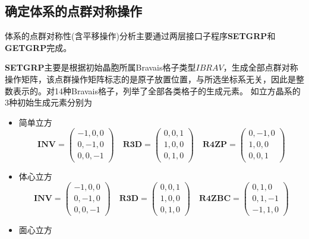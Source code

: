 \documentclass{article}      %
\begin{document}
\subsection{确定体系的点群对称操作}
体系的点群对称性(含平移操作)分析主要通过两层接口子程序\textbf{SETGRP}和\textbf{GETGRP}完成。

\textbf{SETGRP}主要是根据初始晶胞所属\textrm{Bravais}格子类型$\mathit{IBRAV}$，生成全部点群对称操作矩阵，该点群操作矩阵标志的是原子放置位置，与所选坐标系无关，因此是整数表示的。对14种\textrm{Bravais}格子，列举了全部各类格子的生成元素。
如立方晶系的3种初始生成元素分别为
\begin{itemize}
	\item 简单立方
\begin{displaymath}
	\mathbf{INV}=
	\begin{pmatrix}
		-1, 0, 0 \\ 
		0,-1, 0 \\
		0, 0, -1
	\end{pmatrix}\quad
	\mathbf{R3D}=
	\begin{pmatrix}
		0, 0, 1 \\ 
		1, 0, 0 \\
		0, 1, 0
	\end{pmatrix}\quad
	\mathbf{R4ZP}=
	\begin{pmatrix}
		0, -1, 0 \\ 
		1, 0, 0 \\
		0, 0, 1
	\end{pmatrix}
\end{displaymath}
	\item 体心立方
\begin{displaymath}
	\mathbf{INV}=
	\begin{pmatrix}
		-1, 0, 0 \\ 
		0,-1, 0 \\
		0, 0, -1
	\end{pmatrix}\quad
	\mathbf{R3D}=
	\begin{pmatrix}
		0, 0, 1 \\ 
		1, 0, 0 \\
		0, 1, 0
	\end{pmatrix}\quad
	\mathbf{R4ZBC}=
	\begin{pmatrix}
		0, 1, 0 \\ 
		0, 1, -1 \\
		-1, 1, 0
	\end{pmatrix}
\end{displaymath}
	\item 面心立方
\begin{displaymath}

\end{displaymath}
\end{itemize}
\end{document}
